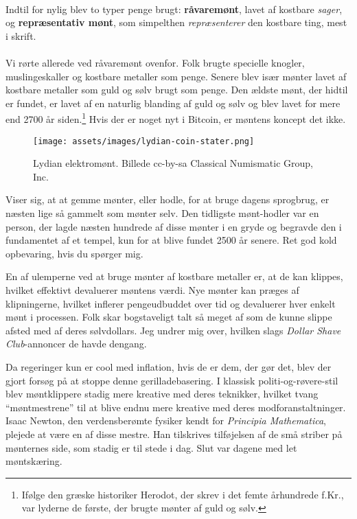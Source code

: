 \paragraph{}
Indtil for nylig blev to typer penge brugt: \textbf{råvaremønt}, lavet
af kostbare \textit{sager}, og \textbf{repræsentativ mønt}, som simpelthen
\textit{repræsenterer} den kostbare ting, mest i skrift.

\paragraph{}
Vi rørte allerede ved råvaremønt ovenfor. Folk brugte specielle knogler,
muslingeskaller og kostbare metaller som penge. Senere blev især mønter lavet af
kostbare metaller som guld og sølv brugt som penge. Den ældste mønt, der hidtil 
er fundet, er lavet af en naturlig blanding af guld og sølv og blev lavet for 
mere end 2700 år siden.\footnote{Ifølge den græske historiker Herodot, der 
skrev i det femte århundrede f.Kr., var lyderne de første, der brugte mønter
af guld og sølv.\cite{coinage-origins}} Hvis der er noget nyt i Bitcoin, er
 møntens koncept det ikke.

\newpage

\begin{figure}[htbp]
  \centering
  \texttt{[image: assets/images/lydian-coin-stater.png]}
  \caption{Lydian elektromønt. Billede cc-by-sa Classical Numismatic
   Group, Inc.}
  \label{fig:lydian-coin-stater}
\end{figure}

Viser sig, at at gemme mønter, eller hodle, for at bruge dagens sprogbrug, er 
næsten lige så gammelt som mønter selv. Den tidligste mønt-hodler var en 
person, der lagde næsten hundrede af disse mønter i en gryde og begravde den 
i fundamentet af et tempel, kun for at blive fundet 2500 år senere. Ret god 
kold opbevaring, hvis du spørger mig.

En af ulemperne ved at bruge mønter af kostbare metaller er, at de kan 
klippes, hvilket effektivt devaluerer møntens værdi. Nye mønter kan præges 
af klipningerne, hvilket inflerer pengeudbuddet over tid og devaluerer hver 
enkelt mønt i processen. Folk skar bogstaveligt talt så meget af som de 
kunne slippe afsted med af deres sølvdollars. Jeg undrer mig over, hvilken 
slags \textit{Dollar Shave Club}-annoncer de havde dengang.

Da regeringer kun er cool med inflation, hvis de er dem, der gør det, blev 
der gjort forsøg på at stoppe denne gerilladebasering. I klassisk 
politi-og-røvere-stil blev møntklippere stadig mere kreative med deres 
teknikker, hvilket tvang \enquote{møntmestrene} til at blive endnu mere 
kreative med deres modforanstaltninger. Isaac Newton, den verdensberømte 
fysiker kendt for \textit{Principia Mathematica}, plejede at være en af 
disse mestre. Han tilskrives tilføjelsen af de små striber på mønternes 
side, som stadig er til stede i dag. Slut var dagene med let møntskæring.

